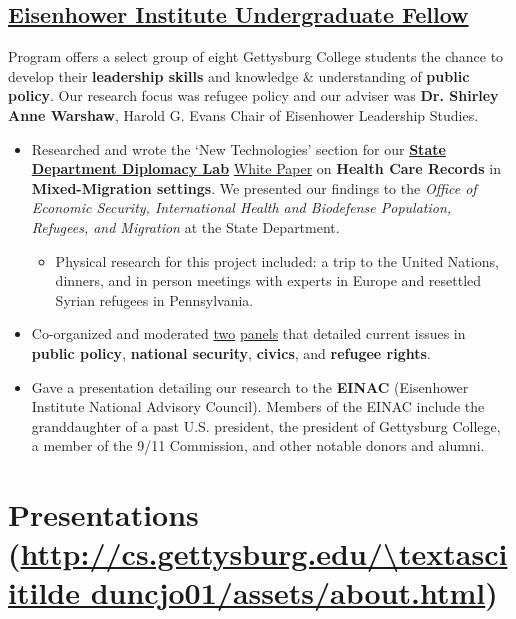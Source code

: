 \documentclass[11pt]{article}
\begin{document}
\subsection*{\underline{Eisenhower Institute Undergraduate Fellow}}
Program offers a select group of eight Gettysburg College students the chance to develop their \textbf{leadership skills} and knowledge \& understanding of \textbf{public policy}. Our research focus was refugee policy and our adviser was \textbf{Dr. Shirley Anne Warshaw}, Harold G. Evans Chair of Eisenhower Leadership Studies.
\begin{itemize}
	\item Researched and wrote the `New Technologies' section for our \href{https://www.state.gov/s/partnerships/ppp/diplab/}{\textbf{State Department Diplomacy Lab}} \href{https://drive.google.com/file/d/0B5fjh9FZOHSYT1dhVF8yYmd4UEk/view?usp=sharing}{White Paper} on \textbf{Health Care Records} in \textbf{Mixed-Migration settings}. We presented our findings to the \textit{Office of Economic Security, International Health and Biodefense Population, Refugees, and Migration} at the State Department. 
	\begin{itemize}
		\item Physical research for this project included: a trip to the United Nations, dinners, and in person meetings with experts in Europe and resettled Syrian refugees in Pennsylvania.
	\end{itemize}
	\item Co-organized and moderated \href{http://cs.gettysburg.edu/~duncjo01/assets/media/EI_panel_f16.pdf}{two} \href{http://cs.gettysburg.edu/~duncjo01/assets/media/EI_panel_s17_second.pdf}{panels} that detailed current issues in \textbf{public policy}, \textbf{national security}, \textbf{civics}, and \textbf{refugee rights}. 
	\item Gave a presentation detailing our research to the \textbf{EINAC} (Eisenhower Institute National Advisory Council). Members of the EINAC include the granddaughter of a past U.S. president, the president of Gettysburg College, a member of the 9/11 Commission, and other notable donors and alumni.
\end{itemize}

\section*{Presentations (\url{http://cs.gettysburg.edu/\textasciitilde duncjo01/assets/about.html})}
\end{document}

